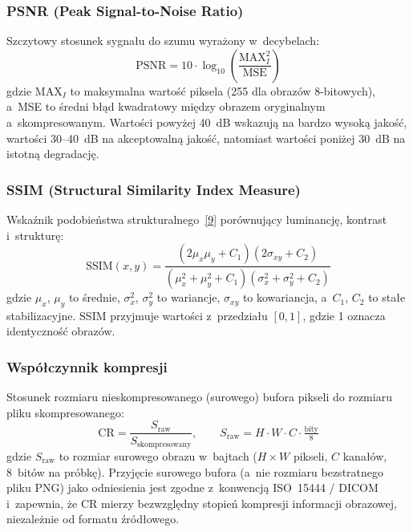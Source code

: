 \documentclass[12pt,a4paper]{article}
\newcommand{\mycite}[1]{\hyperlink{bib#1}{[#1]}}
\begin{document}
\subsubsection{PSNR (Peak Signal-to-Noise Ratio)}
Szczytowy stosunek sygnału do szumu wyrażony w~decybelach:
\begin{equation}
    \text{PSNR} = 10 \cdot \log_{10}\left(\frac{\mathrm{MAX}_I^2}{\text{MSE}}\right)
\end{equation}
gdzie $\mathrm{MAX}_I$ to maksymalna wartość piksela (255 dla obrazów 8-bitowych), a~MSE to średni błąd kwadratowy między obrazem oryginalnym a~skompresowanym. Wartości powyżej 40~dB wskazują na bardzo wysoką jakość, wartości 30--40~dB na akceptowalną jakość, natomiast wartości poniżej 30~dB na istotną degradację.

\subsubsection{SSIM (Structural Similarity Index Measure)}
Wskaźnik podobieństwa strukturalnego~\mycite{9} porównujący luminancję, kontrast i~strukturę:
\begin{equation}
    \text{SSIM}(x,y) = \frac{(2\mu_x\mu_y + C_1)(2\sigma_{xy} + C_2)}{(\mu_x^2 + \mu_y^2 + C_1)(\sigma_x^2 + \sigma_y^2 + C_2)}
\end{equation}
gdzie $\mu_x$, $\mu_y$ to średnie, $\sigma_x^2$, $\sigma_y^2$ to wariancje, $\sigma_{xy}$ to kowariancja, a~$C_1$, $C_2$ to stałe stabilizacyjne. SSIM przyjmuje wartości z~przedziału $[0, 1]$, gdzie 1 oznacza identyczność obrazów.

\subsubsection{Współczynnik kompresji}
\label{sec:cr}
Stosunek rozmiaru nieskompresowanego (surowego) bufora pikseli do rozmiaru pliku skompresowanego:
\begin{equation}
    \mathrm{CR} = \frac{S_{\text{raw}}}{S_{\text{skompresowany}}}, \qquad S_{\text{raw}} = H \cdot W \cdot C \cdot \tfrac{\text{bity}}{8}
\end{equation}
gdzie $S_{\text{raw}}$ to rozmiar surowego obrazu w~bajtach ($H \times W$ pikseli, $C$ kanałów, 8~bitów na próbkę). Przyjęcie surowego bufora (a~nie rozmiaru bezstratnego pliku PNG) jako odniesienia jest zgodne z~konwencją ISO~15444 / DICOM i~zapewnia, że CR mierzy bezwzględny stopień kompresji informacji obrazowej, niezależnie od formatu źródłowego.
\end{document}
